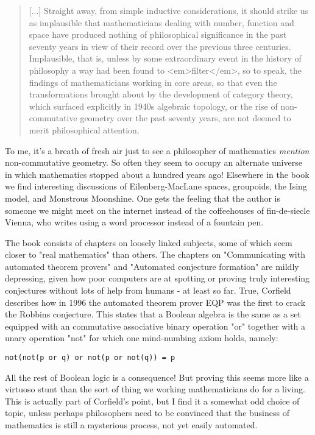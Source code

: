 \begin{quote}
     [...] Straight away, from simple inductive considerations, 
     it should strike us as implausible that mathematicians 
     dealing with number, function and space have produced 
     nothing of philosophical significance in the past seventy 
     years in view of their record over the previous three centuries.
     Implausible, that is, unless by some extraordinary event 
     in the history of philosophy a way had been found to <em>filter</em>,
     so to speak, the findings of mathematicians working in core
     areas, so that even the transformations brought about by
     the development of category theory, which surfaced explicitly
     in 1940s algebraic topology, or the rise of non-commutative
     geometry over the past seventy years, are not deemed to merit
     philosophical attention.  

\end{quote}
    
To me, it's a breath of fresh air just to see a philosopher
of mathematics \emph{mention} non-commutative geometry.  So often 
they seem to occupy an alternate universe in which mathematics 
stopped about a hundred years ago!  Elsewhere in the book 
we find interesting discussions of Eilenberg-MacLane spaces, 
groupoids, the Ising model, and Monstrous Moonshine.  One
gets the feeling that the author is someone we might meet 
on the internet instead of the coffeehouses of fin-de-siecle 
Vienna, who writes using a word processor instead of
a fountain pen.    

The book consists of chapters on loosely linked subjects,
some of which seem closer to "real mathematics" than others.
The chapters on "Communicating with automated theorem provers" 
and "Automated conjecture formation" are mildly depressing, 
given how poor computers are at spotting or proving truly 
interesting conjectures without lots of help from humans -
at least so far.  True, Corfield describes how in 1996 the 
automated theorem prover EQP was the first to crack the 
Robbins conjecture.  This states that a Boolean algebra is 
the same as a set equipped with an commutative associative 
binary operation "or" together with a unary operation "not" 
for which one mind-numbing axiom holds, namely:

\begin{verbatim}
not(not(p or q) or not(p or not(q)) = p
\end{verbatim}
    
All the rest of Boolean logic is a consequence!   But proving 
this seems more like a virtuoso stunt than the sort of thing 
we working mathematicians do for a living.  This is actually 
part of Corfield's point, but I find it a somewhat odd choice 
of topic, unless perhaps philosophers need to be convinced 
that the business of mathematics is still a mysterious process, 
not yet easily automated.

